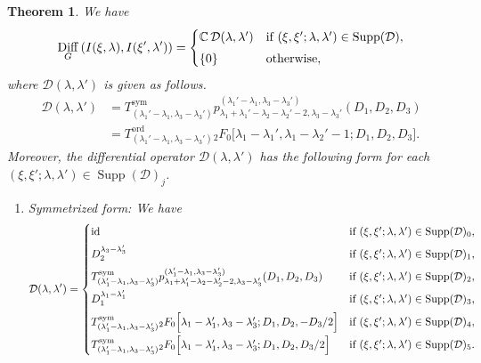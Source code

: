 \documentclass[a4paper,11pt,reqno]{amsart}
\newcommand{\CC}{\mathbb{C}}
\newcommand{\calD}{\mathcal{D}}
\newcommand{\0}{{\bf 0}}
\newcommand{\1}{{\bf 1}}
\DeclareMathOperator{\id}{id}
\newcommand{\ord}{{\mathrm{ord}}}
\DeclareMathOperator{\Supp}{Supp}
\DeclareMathOperator{\Diff}{Diff}
\theoremstyle{plain}
\newtheorem{theorem}[equation]{Theorem}
\theoremstyle{definition}
\numberwithin{equation}{section}
\theoremstyle{definition}
\begin{document}
\begin{theorem}\label{thm:cons_DIOs}
We have
\begin{equation*}
\Diff_{G}\left(I(\xi, \lambda), I(\xi', \lambda')\right)
=
\begin{cases}
\CC\, \calD(\lambda, \lambda') & 
\textnormal{if $(\xi, \xi'; \lambda, \lambda') \in \Supp(\calD)$},\\[3pt]
\{0\} & \textnormal{otherwise},
\end{cases}
\end{equation*}
where $\calD(\lambda, \lambda')$ 
is given as follows.
\begin{align*}
\calD(\lambda,\lambda')
&=T^{\mathrm{sym}}_{(\lambda_1'-\lambda_1,\lambda_3-\lambda_3')}
p_{\lambda_1+\lambda_1'-\lambda_2-\lambda_2'-2,\lambda_3-\lambda_3'}^{(\lambda_1'-\lambda_1,\lambda_3-\lambda_3')}
(D_1, D_2, D_3)\\[3pt]
&=T^\ord_{(\lambda_1'-\lambda_1,\lambda_3-\lambda_3')}
{}_2F_0\Big [\lambda_1-\lambda_1', \lambda_1-\lambda_2'-1; D_1, D_2, D_3\Big ].
\end{align*}
Moreover, the differential operator $\calD(\lambda,\lambda')$ has 
the following form for each $(\xi, \xi'; \lambda, \lambda') \in \Supp(\calD)_j$.
\begin{enumerate}[label=\normalfont{(\arabic*)}]
\item 
Symmetrized form: We have
\begin{equation*}
\calD(\lambda,\lambda')
=
\begin{cases}
\id & 
\textnormal{if $(\xi, \xi'; \lambda, \lambda') \in \Supp(\calD)_0$},\\[5pt]
D_2^{\lambda_3-\lambda_3'} & 
\textnormal{if $(\xi, \xi'; \lambda, \lambda')  \in \Supp(\calD)_1$},\\[5pt]
T^{\mathrm{sym}}_{(\lambda_1'-\lambda_1,\lambda_3-\lambda_3')}
p_{\lambda_1+\lambda_1'-\lambda_2-\lambda_2'-2,\lambda_3-\lambda_3'}^{(\lambda_1'-\lambda_1,\lambda_3-\lambda_3')}
(D_1, D_2, D_3) & 
\textnormal{if $(\xi, \xi'; \lambda, \lambda')  \in \Supp(\calD)_2$},\\[5pt]
D_1^{\lambda_1-\lambda_1'} & 
\textnormal{if $(\xi, \xi'; \lambda, \lambda')  \in \Supp(\calD)_3$},\\[5pt]
T^{\mathrm{sym}}_{(\lambda_1'-\lambda_1,\lambda_3-\lambda_3')}
{}_2F_0\Big [\lambda_1-\lambda_1', \lambda_3-\lambda_3'; D_1, D_2, -D_3/2\Big ]
& 
\textnormal{if $(\xi, \xi'; \lambda, \lambda')  \in \Supp(\calD)_4$},\\[5pt]
T^{\mathrm{sym}}_{(\lambda_1'-\lambda_1,\lambda_3-\lambda_3')}
{}_2F_0\Big [\lambda_1-\lambda_1', \lambda_3-\lambda_3'; D_1, D_2, D_3/2\Big ]
& 
\textnormal{if $(\xi, \xi'; \lambda, \lambda')  \in \Supp(\calD)_5$}.
\end{cases}
\end{equation*}


\end{enumerate}
\end{theorem}
\end{document}
